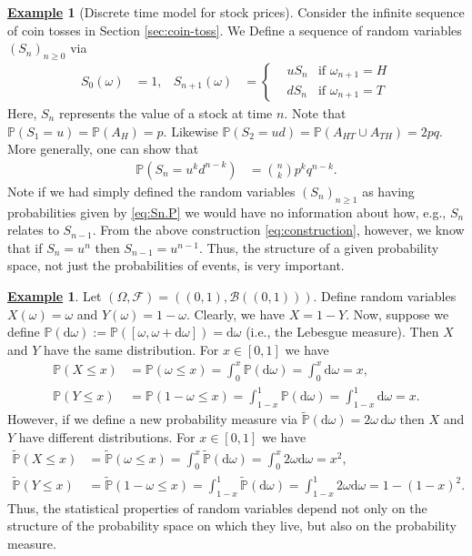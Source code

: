 \documentclass[12pt]{book}
\numberwithin{equation}{chapter}
\theoremstyle{plain}
\numberwithin{theorem}{section}
\theoremstyle{definition}
\newtheorem{example}[theorem]{\underline{Example}}
\numberwithin{exercise}{chapter}
\newcommand{\<}{\langle}
\renewcommand{\>}{\rangle}
\renewcommand{\(}{\left(}
\renewcommand{\)}{\right)}
\renewcommand{\[}{\left[}
\renewcommand{\]}{\right]}
\newcommand\Pb{\mathds{P}}
\newcommand\Bc{\mathscr{B}}
\newcommand\Fc{\mathscr{F}}
\newcommand\om{\omega}
\newcommand\Om{\Omega}
\newcommand\Pbt{\widetilde{\Pb}}
\newcommand\dd{\mathrm{d}}
\begin{document}
\begin{example}[Discrete time model for stock prices]
\label{ex:stock}
Consider the infinite sequence of coin tosses in Section \ref{sec:coin-toss}.  We Define a sequence of random variables $(S_n)_{n \geq 0}$ via
\begin{align}
S_0(\om)
	&=	1 , &
S_{n+1}(\om)
	&=	\left\{ \begin{aligned}
			&	u S_n & \text{if $\om_{n+1} = H$}\\
			&	d S_n & \text{if $\om_{n+1} = T$}
			\end{aligned} \right. \label{eq:construction}
\end{align} 
Here, $S_n$ represents the value of a stock at time $n$.
Note that $\Pb( S_1 = u ) = \Pb( A_H ) = p$.  Likewise $\Pb( S_2 = u d ) = \Pb( A_{HT} \cup A_{TH} ) = 2 p q$.  More generally, one can show that
\begin{align}
\Pb( S_n = u^k d^{n-k} )
	&=	\binom{n}{k} p^k q^{n-k} . \label{eq:Sn.P}
\end{align}
Note if we had simply defined the random variables $(S_n)_{n \geq 1}$ as having probabilities given by \eqref{eq:Sn.P} we would have no information about how, e.g., $S_n$ relates to $S_{n-1}$.  From the above construction \eqref{eq:construction}, however, we know that if $S_n = u^n$ then $S_{n-1} = u^{n-1}$.  Thus, the structure of a given probability space, not just the probabilities of events, is very important.
\end{example}

\begin{example}
\label{ex:XY}
Let $(\Om, \Fc) = ((0,1),\Bc((0,1)))$.  Define random variables $X(\om) = \om$ and $Y(\om) = 1 - \om$.  Clearly, we have $X = 1-Y$.  Now, suppose we define $\Pb(\dd \om):= \Pb([\om,\om + \dd \om]) = \dd \om$ (i.e., the Lebesgue measure).  Then $X$ and $Y$ have the same distribution.  For $x \in [0,1]$ we have
\begin{align}
\Pb(X \leq x)
	&= \Pb(\om \leq x) = \int_0^x \Pb(\dd \om) = \int_0^x \dd \om = x , \\
\Pb(Y \leq x)
	&= \Pb(1-\om \leq x) = \int_{1-x}^1 \Pb(\dd \om) = \int_{1-x}^1 \dd \om = x .
\end{align}
However, if we define a new probability measure via $\Pbt( \dd \om ) = 2 \om \, \dd \om$ then $X$ and $Y$ have different distributions.  For $x \in [0,1]$ we have
\begin{align}
\Pbt(X \leq x)
	&= \Pbt(\om \leq x) = \int_0^x \Pbt(\dd \om) = \int_0^x 2 \om \dd \om = x^2 , \\
\Pbt(Y \leq x)
	&= \Pbt(1-\om \leq x) = \int_{1-x}^1 \Pbt(\dd \om) = \int_{1-x}^1 2 \om \dd \om = 1-(1-x)^2 .
\end{align}
Thus, the statistical properties of random variables depend not only on the structure of the probability space on which they live, but also on the probability measure.
\end{example}
\end{document}
